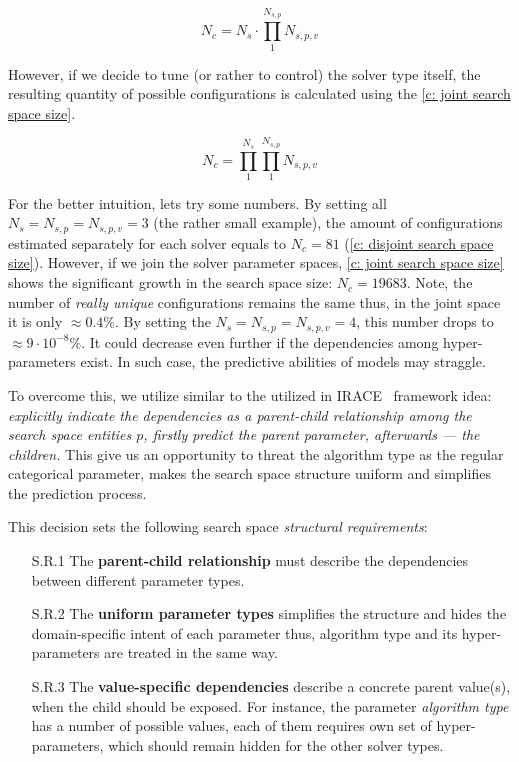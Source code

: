 \begin{equation}
N_c = N_s \cdot \prod_{1}^{N_{s,p}} N_{s,p,v}
\label{c: disjoint search space size}
\end{equation}

However, if we decide to tune (or rather to control) the solver type itself, the resulting quantity of possible configurations is calculated using the \cref{c: joint search space size}.

\begin{equation}
N_c = \prod_{1}^{N_{s}} \prod_{1}^{N_{s,p}} N_{s,p,v}
\label{c: joint search space size}
\end{equation}

For the better intuition, lets try some numbers. By setting all $N_s = N_{s,p} = N_{s,p,v} = 3$ (the rather small example), the amount of configurations estimated separately for each solver equals to $N_c = 81$ (\cref{c: disjoint search space size}). However, if we join the solver parameter spaces, \cref{c: joint search space size} shows the significant growth in the search space size: $N_c = 19683$. Note, the number of \emph{really unique} configurations remains the same thus, in the joint space it is only $\approx 0.4\%$. By setting the $N_s = N_{s,p} = N_{s,p,v} = 4$, this number drops to $\approx 9 \cdot 10^{-8}\%$. It could decrease even further if the dependencies among hyper-parameters exist. In such case, the predictive abilities of models may straggle.

To overcome this, we utilize similar to the utilized in IRACE~\cite{lopez2016irace} framework idea: \emph{explicitly indicate the dependencies as a parent-child relationship among the search space entities $p$, firstly predict the parent parameter, afterwards — the children.} This give us an opportunity to threat the algorithm type as the regular categorical parameter, makes the search space structure uniform and simplifies the prediction process.

This decision sets the following search space \emph{structural requirements}:
\begin{enumerate}
	\item[S.R.1] The \textbf{parent-child relationship} must describe the dependencies between different parameter types.

	\item[S.R.2] The \textbf{uniform parameter types} simplifies the structure and hides the domain-specific intent of each parameter thus, algorithm type and its hyper-parameters are treated in the same way.

	\item[S.R.3] The \textbf{value-specific dependencies} describe a concrete parent value(s), when the child should be exposed. For instance, the parameter \textit{algorithm type} has a number of possible values, each of them requires own set of hyper-parameters, which should remain hidden for the other solver types.
\end{enumerate}

